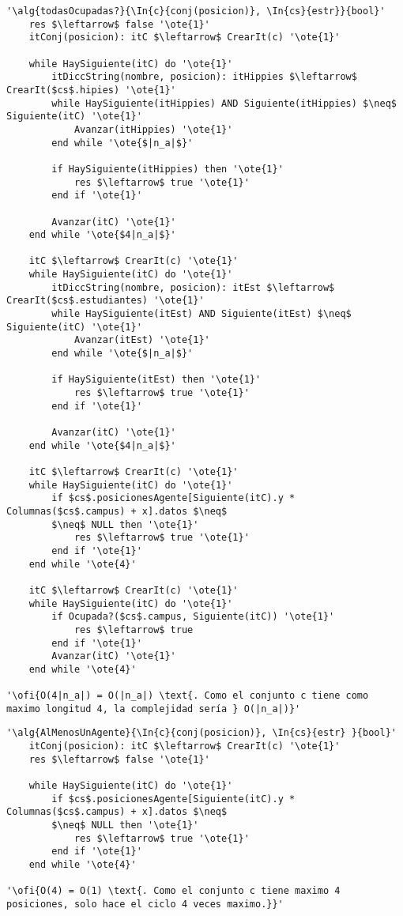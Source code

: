 \begin{lstlisting}[mathescape]
'\alg{todasOcupadas?}{\In{c}{conj(posicion)}, \In{cs}{estr}}{bool}'
	res $\leftarrow$ false '\ote{1}'
	itConj(posicion): itC $\leftarrow$ CrearIt(c) '\ote{1}'
	
	while HaySiguiente(itC) do '\ote{1}'
		itDiccString(nombre, posicion): itHippies $\leftarrow$ CrearIt($cs$.hipies) '\ote{1}'
		while HaySiguiente(itHippies) AND Siguiente(itHippies) $\neq$ Siguiente(itC) '\ote{1}'
			Avanzar(itHippies) '\ote{1}'
		end while '\ote{$|n_a|$}'

		if HaySiguiente(itHippies) then '\ote{1}'
			res $\leftarrow$ true '\ote{1}'
		end if '\ote{1}'

		Avanzar(itC) '\ote{1}'
	end while '\ote{$4|n_a|$}'

	itC $\leftarrow$ CrearIt(c) '\ote{1}'
	while HaySiguiente(itC) do '\ote{1}'
		itDiccString(nombre, posicion): itEst $\leftarrow$ CrearIt($cs$.estudiantes) '\ote{1}'
		while HaySiguiente(itEst) AND Siguiente(itEst) $\neq$ Siguiente(itC) '\ote{1}'
			Avanzar(itEst) '\ote{1}'
		end while '\ote{$|n_a|$}'

		if HaySiguiente(itEst) then '\ote{1}'
			res $\leftarrow$ true '\ote{1}'
		end if '\ote{1}'

		Avanzar(itC) '\ote{1}'
	end while '\ote{$4|n_a|$}'

	itC $\leftarrow$ CrearIt(c) '\ote{1}'
	while HaySiguiente(itC) do '\ote{1}'
		if $cs$.posicionesAgente[Siguiente(itC).y * Columnas($cs$.campus) + x].datos $\neq$
		$\neq$ NULL then '\ote{1}'
			res $\leftarrow$ true '\ote{1}'
		end if '\ote{1}'
	end while '\ote{4}'

	itC $\leftarrow$ CrearIt(c) '\ote{1}'
	while HaySiguiente(itC) do '\ote{1}'
		if Ocupada?($cs$.campus, Siguiente(itC)) '\ote{1}'
			res $\leftarrow$ true
		end if '\ote{1}'
		Avanzar(itC) '\ote{1}'
	end while '\ote{4}'

'\ofi{O(4|n_a|) = O(|n_a|) \text{. Como el conjunto c tiene como maximo longitud 4, la complejidad sería } O(|n_a|)}'
\end{lstlisting}

\begin{lstlisting}[mathescape]
'\alg{AlMenosUnAgente}{\In{c}{conj(posicion)}, \In{cs}{estr} }{bool}'
	itConj(posicion): itC $\leftarrow$ CrearIt(c) '\ote{1}'
	res $\leftarrow$ false '\ote{1}'

	while HaySiguiente(itC) do '\ote{1}'
		if $cs$.posicionesAgente[Siguiente(itC).y * Columnas($cs$.campus) + x].datos $\neq$
		$\neq$ NULL then '\ote{1}'
			res $\leftarrow$ true '\ote{1}'
		end if '\ote{1}'
	end while '\ote{4}'

'\ofi{O(4) = O(1) \text{. Como el conjunto c tiene maximo 4 posiciones, solo hace el ciclo 4 veces maximo.}}'
\end{lstlisting}


